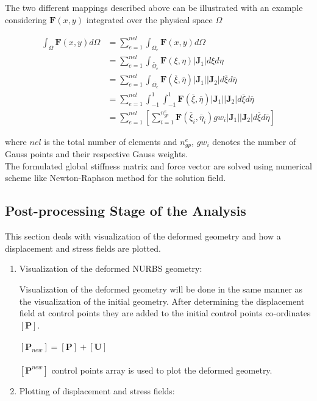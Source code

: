 \documentclass[12pt]{article}
\begin{document}
The two different mappings described above can be illustrated with an example considering $ \textbf{F}(x,y)$ integrated over the physical space $\Omega$

\begin{equation*}
\begin{split}
\int_{\Omega} \textbf{F}(x,y)d\Omega & = \sum_{e=1}^{nel} \int_{\Omega_e} \textbf{F}(x,y) d\Omega  \\
 & = \sum_{e=1}^{nel} \int_{\widetilde{\Omega_e}} \textbf{F}(\xi,\eta)|\textbf{J}_1| d\xi d\eta \\
 & = \sum_{e=1}^{nel} \int_{\overline{\Omega_e}} \textbf{F}(\overline\xi,\overline\eta)|\textbf{J}_1||\textbf{J}_2| d\overline\xi d\overline\eta  \\
 & = \sum_{e=1}^{nel} \int_{-1}^{1} \int_{-1}^{1} \textbf{F}(\overline\xi,\overline\eta)|\textbf{J}_1||\textbf{J}_2| d\overline\xi d\overline\eta  \\
 & = \sum_{e=1}^{nel} \left[ \sum_{i=1}^{n_{gp}^e} \textbf{F}(\overline\xi_i,\overline\eta_i) gw_i |\textbf{J}_1||\textbf{J}_2| d\overline\xi d\overline\eta \right]
\end{split}
\end{equation*}

\noindent
where $nel$ is the total number of elements and $n_{gp}^e$, $gw_i$ denotes the number of Gauss points and their respective Gauss weights.\\
\noindent
The formulated global stiffness matrix and force vector are solved using numerical scheme like Newton-Raphson method for the solution field.

\subsection{Post-processing Stage of the Analysis}
This section deals with visualization of the deformed geometry and how a displacement and stress fields are plotted. 

\begin{enumerate}[leftmargin=*]
\item Visualization of the deformed NURBS geometry:

Visualization of the deformed geometry will be done in the same manner as the visualization of the initial geometry. After determining the displacement field at control points they are added to the initial control points co-ordinates $[\textbf{P}]$.\\
\\
$[\textbf{P}_{new}]=[\textbf{P}]+[\textbf{U}]$ \\
\\
$[\textbf{P}^{new}]$ control points array is used to plot the deformed geometry.

\item Plotting of displacement and stress fields:

\end{enumerate}
\end{document}
